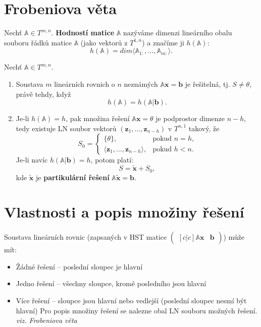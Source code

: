 \documentclass{szzclass}
\newcommand{\mathbbm}[1]{\boldsymbol#1}
\begin{document}
\section{Frobeniova věta}
\begin{definition}
Nechť $\mathbb{A}\in T^{m,n}$. \textbf{Hodností matice} $\mathbb{A}$ nazýváme dimenzi lineárního obalu souboru řádků matice $\mathbb{A}$ (jako vektorů z $T^{1,n}$) a značíme ji $h(\mathbb{A})$:
\begin{equation}
  h(\mathbb{A})=dim\langle \mathbb{A}_{1:},\dots,\mathbb{A}_{m:}\rangle.
\end{equation}
\end{definition}

\begin{theorem}
Nechť $\mathbb{A}\in T^{m,n}$.
\begin{enumerate}
\item Soustava $m$ lineárních rovnich o $n$ neznámých $\mathbb{A} \mathbbm{x}=\mathbbm{b}$ je řešitelná, tj. $S\neq\theta$, právě tehdy, když
$$
h(\mathbb{A})=h(\mathbb{A} | \mathbbm{b}).
$$
\item Je-li $h(\mathbb{A})=h$, pak množina řešení $\mathbb{A} \mathbbm{x}=\theta$ je podprostor dimenze $n-h$, tedy existuje LN soubor vektorů $(\mathbbm{z}_1,\dots,\mathbbm{z}_{n-h})$ v $T^{n,1}$ takový, že
$$ S_0=\begin{cases}
       \{\theta\}, & \text{pokud $n=h$,} \\
       \langle \mathbbm{z}_1,\dots,\mathbbm{z}_{n-h}\rangle, & \text{pokud $h<n$.}
       \end{cases}
$$
Je-li navíc $h(\mathbb{A}|\mathbbm{b})=h$, potom platí:
$$
S=\widetilde{\mathbbm{x}} + S_0,
$$ kde $\widetilde{\mathbbm{x}}$ je \textbf{partikulární řešení} $\mathbb{A} \widetilde{\mathbbm{x}}=\mathbbm{b}$.
\end{enumerate}
\end{theorem}

\section{Vlastnosti a popis množiny řešení}
Soustava lineárních rovnic (zapsaných v HST matice $\begin{pmatrix}[c|c]\mathbb{A}\mathbbm{x}&\mathbbm{b}\end{pmatrix}$) může mít:
\begin{itemize}
\item Žádné řešení -- poslední sloupec je hlavní
\item Jedno řešení -- všechny sloupce, kromě posledního jsou hlavní
\item Více řešení -- sloupce jsou hlavní nebo vedlejší (poslední sloupec nesmí být hlavní)
Pro popis množiny řešení se nalezne obal LN souboru možných řešení. \emph{viz. Frobeniova věta}
\end{itemize}
\end{document}
